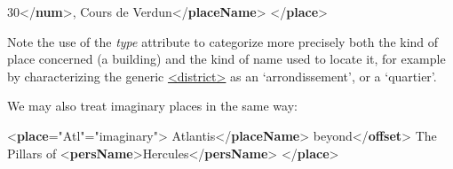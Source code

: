 \begin{shaded}
\hspace*{1em}\hspace*{1em}30{</\textbf{num}>}, Cours de Verdun{</\textbf{placeName}>}\mbox{}\newline 
{}\mbox{}\newline 
{</\textbf{place}>}\end{shaded}\egroup\par \noindent  Note the use of the {\itshape type} attribute to categorize more precisely both the kind of place concerned (a building) and the kind of name used to locate it, for example by characterizing the generic \hyperref[TEI.district]{<district>} as an ‘arrondissement’, or a ‘quartier’.\par
We may also treat imaginary places in the same way: \par\bgroup{}\exampleFont \begin{shaded}\noindent\mbox{}{<\textbf{place}\hspace*{1em}{xml:id}="{Atl}"\hspace*{1em}{type}="{imaginary}">}\mbox{}\newline 
{}Atlantis{</\textbf{placeName}>}\mbox{}\newline 
{}\mbox{}\newline 
\hspace*{1em}beyond{</\textbf{offset}>}\mbox{}\newline 
\hspace*{1em}The Pillars of {<\textbf{persName}>}Hercules{</\textbf{persName}>}\mbox{}\newline 
\hspace*{1em}\mbox{}\newline 
{}\mbox{}\newline 
{</\textbf{place}>}\end{shaded}\egroup\par \par
